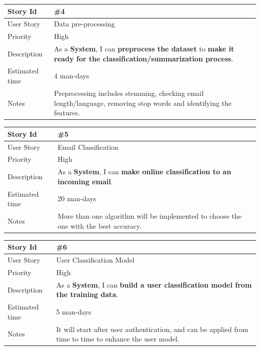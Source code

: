 \begin{tabular}{|p{3cm}|p{10cm}|}
\hline
\cellcolor[gray]{0.9} Story Id & \#4 \\ \hline
\cellcolor[gray]{0.9} User Story & Data pre-processing \\ \hline
\cellcolor[gray]{0.9} Priority & High\\ \hline
\cellcolor[gray]{0.9} Description & 
	As a \textbf{System}, I can \textbf{preprocess the dataset} to
	\textbf{make it ready for the classification/summarization process}. \\ \hline
\cellcolor[gray]{0.9} Estimated time & 4 man-days\\ \hline
\cellcolor[gray]{0.9} Notes & 
	Preprocessing includes stemming, checking email length/language,
	removing stop words and identifying the features. \\ \hline
\end{tabular}

\begin{tabular}{|p{3cm}|p{10cm}|}
\hline
\cellcolor[gray]{0.9} Story Id & \#5 \\ \hline
\cellcolor[gray]{0.9} User Story & Email Classification \\ \hline
\cellcolor[gray]{0.9} Priority & High\\ \hline
\cellcolor[gray]{0.9} Description & 
	As a \textbf{System}, I can \textbf{make online classification to
	an incoming email}. \\ \hline
\cellcolor[gray]{0.9} Estimated time & 20 man-days\\ \hline
\cellcolor[gray]{0.9} Notes & 
	More than one algorithm will be implemented to choose the one with 
	the best accuracy. \\ \hline
\end{tabular}

\begin{tabular}{|p{3cm}|p{10cm}|}
\hline
\cellcolor[gray]{0.9} Story Id & \#6 \\ \hline
\cellcolor[gray]{0.9} User Story & User Classification Model \\ \hline
\cellcolor[gray]{0.9} Priority & High\\ \hline
\cellcolor[gray]{0.9} Description & 
	As a \textbf{System}, I can \textbf{build a user classification 
	model from the training data}. \\ \hline
\cellcolor[gray]{0.9} Estimated time & 5 man-days\\ \hline
\cellcolor[gray]{0.9} Notes & 
	It will start after user authentication, and can be applied 
	from time to time to enhance the user model. \\ \hline
\end{tabular}

